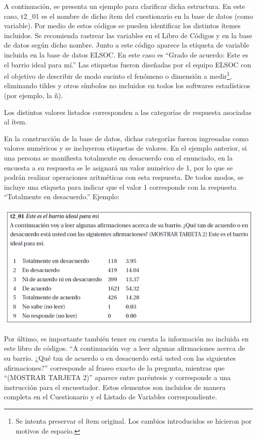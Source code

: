 \documentclass[
  openany]{book}
\let\origfigure\figure
\let\endorigfigure\endfigure
\renewenvironment{figure}[1][2] {
    \expandafter\origfigure\expandafter[H]
} {
    \endorigfigure
}
\begin{document}
A continuación, se presenta un ejemplo para clarificar dicha estructura. En este caso, t2\_01 es el nombre de dicho ítem del cuestionario en la base de datos (como variable). Por medio de estos códigos se pueden identificar los distintos ítemes incluidos. Se recomienda rastrear las variables en el Libro de Códigos y en la base de datos según dicho nombre. Junto a este código aparece la etiqueta de variable incluida en la base de datos ELSOC. En este caso es ``Grado de acuerdo: Este es el barrio ideal para mí.'' Las etiquetas fueron diseñadas por el equipo ELSOC con el objetivo de describir de modo sucinto el fenómeno o dimensión a medir\footnote{Se intenta preservar el ítem original. Los cambios introducidos se hicieron por motivos de espacio.}, eliminando tildes y otros símbolos no incluidos en todos los softwares estadísticos (por ejemplo, la ñ).

Los distintos valores listados corresponden a las categorías de respuesta asociadas al ítem.

En la construcción de la base de datos, dichas categorías fueron ingresadas como valores numéricos y se incluyeron etiquetas de valores. En el ejemplo anterior, si una persona se manifiesta totalmente en desacuerdo con el enunciado, en la encuesta a su respuesta se le asignará un valor numérico de 1, por lo que se podrán realizar operaciones aritméticas con esta respuesta. De todos modos, se incluye una etiqueta para indicar que el valor 1 corresponde con la respuesta ``Totalmente en desacuerdo.'' Ejemplo:

\begin{figure}
\centering
\includegraphics{../Imagenes/Figura_item_2018c.png}
\caption{\label{fig:item} Ejemplo de Pregunta con Múltiples Ítemes en ELSOC}
\end{figure}

Por último, es importante también tener en cuenta la información no incluida en este libro de códigos. ``A continuación voy a leer algunas afirmaciones acerca de su barrio. ¿Qué tan de acuerdo o en desacuerdo está usted con las siguientes afirmaciones?'' corresponde al fraseo exacto de la pregunta, mientras que ``(MOSTRAR TARJETA 2)'' aparece entre paréntesis y corresponde a una instrucción para el encuestador. Estos elementos son incluidos de manera completa en el Cuestionario y el Listado de Variables correspondiente.
\end{document}
